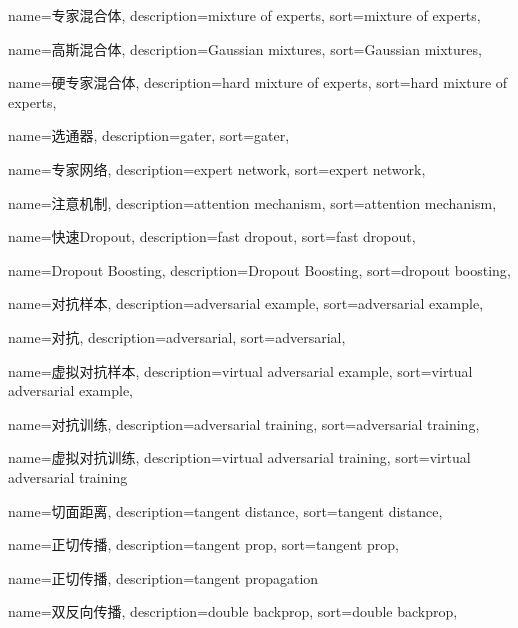 {
  name=专家混合体,
  description={mixture of experts},
  sort={mixture of experts},
}

{
	name=高斯混合体,
	description={Gaussian mixtures},
	sort={Gaussian mixtures},
}

{
  name=硬专家混合体, %
  description={hard mixture of experts},
  sort={hard mixture of experts},
}

{
  name=选通器,
  description={gater},
  sort={gater},
}

{
  name=专家网络,
  description={expert network},
  sort={expert network},
}

{
  name=注意机制,
  description={attention mechanism},
  sort={attention mechanism},
}

{
  name=快速Dropout,
  description={fast dropout},
  sort={fast dropout},
}

{
  name=Dropout Boosting,
  description={Dropout Boosting},
  sort={dropout boosting},
}

{
  name=对抗样本,
  description={adversarial example},
  sort={adversarial example},
}


{
	name=对抗,
	description={adversarial},
	sort={adversarial},
}

{
  name=虚拟对抗样本,
  description={virtual adversarial example},
  sort={virtual adversarial example},
}

{
  name=对抗训练,
  description={adversarial training},
  sort={adversarial training},
}

{
  name=虚拟对抗训练,
  description={virtual adversarial training},
  sort={virtual adversarial training}
}

{
  name=切面距离,
  description={tangent distance},
  sort={tangent distance},
}

{
  name=正切传播,
  description={tangent prop},
  sort={tangent prop},
}

{
  name=正切传播,
  description={tangent propagation}
}

{
  name=双反向传播,
  description={double backprop},
  sort={double backprop},
}

